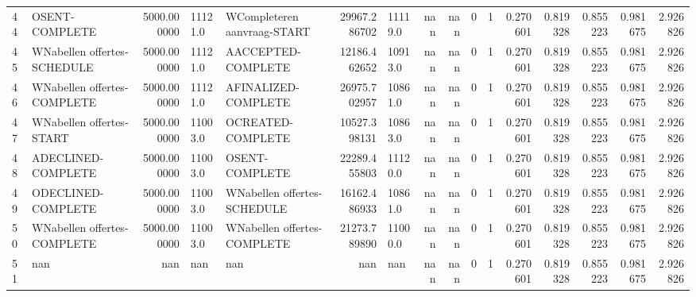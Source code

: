 \begin{tabular}{llrllrlrrrrrrrrr}
44 & O\-SENT-COMPLETE & 5000.000000 & 11121.0 & W\-Completeren aanvraag-START & 29967.286702 & 11119.0 & nan & nan & 0 & 1 & 0.270601 & 0.819328 & 0.855223 & 0.981675 & 2.926826 \\
45 & W\-Nabellen offertes-SCHEDULE & 5000.000000 & 11121.0 & A\-ACCEPTED-COMPLETE & 12186.462652 & 10913.0 & nan & nan & 0 & 1 & 0.270601 & 0.819328 & 0.855223 & 0.981675 & 2.926826 \\
46 & W\-Nabellen offertes-COMPLETE & 5000.000000 & 11121.0 & A\-FINALIZED-COMPLETE & 26975.702957 & 10861.0 & nan & nan & 0 & 1 & 0.270601 & 0.819328 & 0.855223 & 0.981675 & 2.926826 \\
47 & W\-Nabellen offertes-START & 5000.000000 & 11003.0 & O\-CREATED-COMPLETE & 10527.398131 & 10863.0 & nan & nan & 0 & 1 & 0.270601 & 0.819328 & 0.855223 & 0.981675 & 2.926826 \\
48 & A\-DECLINED-COMPLETE & 5000.000000 & 11003.0 & O\-SENT-COMPLETE & 22289.455803 & 11120.0 & nan & nan & 0 & 1 & 0.270601 & 0.819328 & 0.855223 & 0.981675 & 2.926826 \\
49 & O\-DECLINED-COMPLETE & 5000.000000 & 11003.0 & W\-Nabellen offertes-SCHEDULE & 16162.486933 & 10861.0 & nan & nan & 0 & 1 & 0.270601 & 0.819328 & 0.855223 & 0.981675 & 2.926826 \\
50 & W\-Nabellen offertes-COMPLETE & 5000.000000 & 11003.0 & W\-Nabellen offertes-COMPLETE & 21273.789890 & 11000.0 & nan & nan & 0 & 1 & 0.270601 & 0.819328 & 0.855223 & 0.981675 & 2.926826 \\
51 & nan & nan & nan & nan & nan & nan & nan & nan & 0 & 1 & 0.270601 & 0.819328 & 0.855223 & 0.981675 & 2.926826 \\
\end{tabular}
